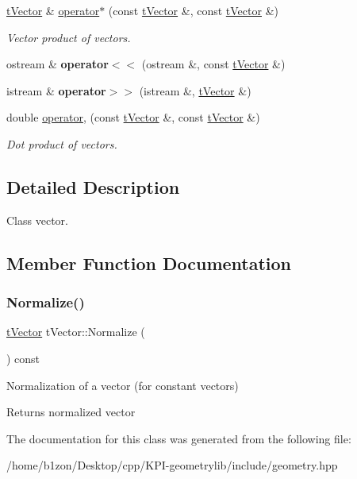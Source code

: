 \begin{DoxyCompactItemize}
\hyperlink{classtVector}{t\+Vector} \& \hyperlink{classtVector_abec310e2c4d30878d11d0b2f5d02cad4}{operator$\ast$} (const \hyperlink{classtVector}{t\+Vector} \&, const \hyperlink{classtVector}{t\+Vector} \&)
\begin{DoxyCompactList}\small\item\em Vector product of vectors. \end{DoxyCompactList}\item 
\mbox{\label{classtVector_afcc0074f806c5d4f45eb32158292ca8c}} 
ostream \& {\bfseries operator$<$$<$} (ostream \&, const \hyperlink{classtVector}{t\+Vector} \&)
\item 
\mbox{\label{classtVector_a40b256a9f985011f794517f158deffe5}} 
istream \& {\bfseries operator$>$$>$} (istream \&, \hyperlink{classtVector}{t\+Vector} \&)
\item 
\mbox{\label{classtVector_a79cac88f76447395991d4dde1f173bfa}} 
double \hyperlink{classtVector_a79cac88f76447395991d4dde1f173bfa}{operator,} (const \hyperlink{classtVector}{t\+Vector} \&, const \hyperlink{classtVector}{t\+Vector} \&)
\begin{DoxyCompactList}\small\item\em Dot product of vectors. \end{DoxyCompactList}\end{DoxyCompactItemize}


\subsection{Detailed Description}
Class vector. 

\subsection{Member Function Documentation}
\mbox{\label{classtVector_a6141302c1bbad21b64e56d93ed0408e5}} 
\subsubsection{\texorpdfstring{Normalize()}{Normalize()}}
{\footnotesize\ttfamily \hyperlink{classtVector}{t\+Vector} t\+Vector\+::\+Normalize (\begin{DoxyParamCaption}{ }\end{DoxyParamCaption}) const}

Normalization of a vector (for constant vectors) \begin{DoxyReturn}{Returns}
normalized vector 
\end{DoxyReturn}


The documentation for this class was generated from the following file\+:\begin{DoxyCompactItemize}
\item 
/home/b1zon/\+Desktop/cpp/\+K\+P\+I-\/geometrylib/include/geometry.\+hpp\end{DoxyCompactItemize}
